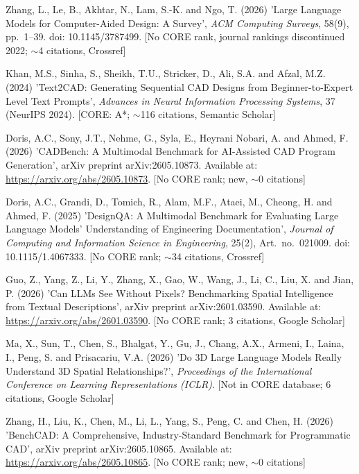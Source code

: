 \documentclass[10pt]{article}
\begin{document}
\begin{list}{}{\setlength{\leftmargin}{2em}\setlength{\itemindent}{-2em}}
\item Zhang, L., Le, B., Akhtar, N., Lam, S.-K. and Ngo, T. (2026) 'Large Language Models for Computer-Aided Design: A Survey', \textit{ACM Computing Surveys}, 58(9), pp.\ 1--39. doi: 10.1145/3787499. [No CORE rank, journal rankings discontinued 2022; $\sim$4 citations, Crossref]
\item Khan, M.S., Sinha, S., Sheikh, T.U., Stricker, D., Ali, S.A. and Afzal, M.Z. (2024) 'Text2CAD: Generating Sequential CAD Designs from Beginner-to-Expert Level Text Prompts', \textit{Advances in Neural Information Processing Systems}, 37 (NeurIPS 2024). [CORE: A*; $\sim$116 citations, Semantic Scholar]
\item Doris, A.C., Sony, J.T., Nehme, G., Syla, E., Heyrani Nobari, A. and Ahmed, F. (2026) 'CADBench: A Multimodal Benchmark for AI-Assisted CAD Program Generation', arXiv preprint arXiv:2605.10873. Available at: \url{https://arxiv.org/abs/2605.10873}. [No CORE rank; new, $\sim$0 citations]
\item Doris, A.C., Grandi, D., Tomich, R., Alam, M.F., Ataei, M., Cheong, H. and Ahmed, F. (2025) 'DesignQA: A Multimodal Benchmark for Evaluating Large Language Models' Understanding of Engineering Documentation', \textit{Journal of Computing and Information Science in Engineering}, 25(2), Art.\ no.\ 021009. doi: 10.1115/1.4067333. [No CORE rank; $\sim$34 citations, Crossref]
\item Guo, Z., Yang, Z., Li, Y., Zhang, X., Gao, W., Wang, J., Li, C., Liu, X. and Jian, P. (2026) 'Can LLMs See Without Pixels? Benchmarking Spatial Intelligence from Textual Descriptions', arXiv preprint arXiv:2601.03590. Available at: \url{https://arxiv.org/abs/2601.03590}. [No CORE rank; 3 citations, Google Scholar]
\item Ma, X., Sun, T., Chen, S., Bhalgat, Y., Gu, J., Chang, A.X., Armeni, I., Laina, I., Peng, S. and Prisacariu, V.A. (2026) 'Do 3D Large Language Models Really Understand 3D Spatial Relationships?', \textit{Proceedings of the International Conference on Learning Representations (ICLR)}. [Not in CORE database; 6 citations, Google Scholar]
\item Zhang, H., Liu, K., Chen, M., Li, L., Yang, S., Peng, C. and Chen, H. (2026) 'BenchCAD: A Comprehensive, Industry-Standard Benchmark for Programmatic CAD', arXiv preprint arXiv:2605.10865. Available at: \url{https://arxiv.org/abs/2605.10865}. [No CORE rank; new, $\sim$0 citations]

\end{list}
\end{document}
